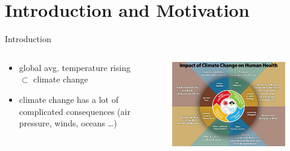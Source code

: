 \section[Intro]{Introduction and Motivation}
\begin{frame}{Introduction}
\begin{columns}
  \begin{column}{.5 \textwidth}
    \begin{itemize}
      \item global avg. temperature rising $\subset$ climate change 
      \item climate change has a lot of complicated consequences (air pressure, winds, oceans \dots)  
    \end{itemize}
    
    
  \end{column}
  \begin{column}{.5 \textwidth}
    \begin{figure}[t]
      \centering
      \includegraphics[width=\columnwidth]{imglib/climate_change_health_impacts.jpg}
    \end{figure}
    
  \end{column}
  
\end{columns}
\end{frame}

